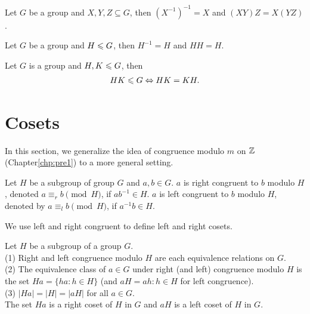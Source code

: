 \begin{proposition}{}{}
    Let $G$ be a group and $X,Y,Z\subseteq G$, then
    $(X^{-1})^{-1}=X$ and $(XY)Z=X(YZ)$.
\end{proposition}

\begin{proposition}{}{}
    Let $G$ be a group and $H\leqslant G$, then
    $H^{-1}=H$ and $HH=H$.
\end{proposition}

\begin{proposition}{}{}
    Let $G$ is a group and $H,K\leqslant G$, then
    \begin{align*}
        HK\leqslant G\Leftrightarrow HK=KH.
    \end{align*}
\end{proposition}

\section{Cosets}
In this section, we generalize the idea of congruence modulo $m$ on $\mathbb{Z}$ (Chapter\ref{chp:pre1}) to 
a more general setting.

\begin{definition}{}{}
    Let $H$ be a subgroup of group $G$ and $a,b\in G$.
    $a$ is right congruent to $b$ modulo $H$, denoted $a\equiv_r b\pmod H$, if $ab^{-1}\in H$.
    $a$ is left congruent to $b$ modulo $H$, denoted by $a\equiv_l b\pmod H$, if $a^{-1}b\in H$.
\end{definition}

We use left and right congruent to define left and right cosets. 

\begin{theorem}{}{}
    Let $H$ be a subgroup of a group $G$.\\
    (1) Right and left congruence modulo $H$ are each equivalence relations on $G$.\\
    (2) The equivalence class of $a\in G$ under right (and left) congruence modulo $H$ is 
    the set $Ha=\{ha:h\in H\}$ (and $aH={ah:h\in H}$ for left congruence).\\
    (3) $|Ha|=|H|=|aH|$ for all $a\in G$. \\
    The set $Ha$ is a right coset of $H$ in $G$ and $aH$ is a left coset of $H$ in $G$.
\end{theorem}

